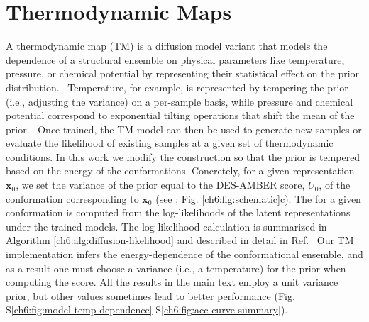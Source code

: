 
\section{Thermodynamic Maps}
{}
\label{ch6:methods:thermodynamic-map}

A thermodynamic map (TM) is a diffusion model variant that models the dependence of a structural ensemble on physical parameters like temperature, pressure, or chemical potential by representing their statistical effect on the prior distribution.~\cite{herron2024inferring,exptm,beyerle2025inferring} Temperature, for example, is represented by tempering the prior (i.e., adjusting the variance) on a per-sample basis, while pressure and chemical potential correspond to exponential tilting operations that shift the mean of the prior.~\cite{herron2024inferring,exptm} Once trained, the TM model can then be used to generate new samples or evaluate the likelihood of existing samples at a given set of thermodynamic conditions. In this work we modify the construction so that the prior is tempered based on the energy of the conformations. Concretely, for a given representation $\mathbf{x}_0$, we set the variance of the prior equal to the DES-AMBER score, $U_0$, of the conformation corresponding to $\mathbf{x}_0$ (see ; Fig. \ref{ch6:fig:schematic}c). The  for a given conformation is computed from the log-likelihoods of the latent representations under the trained models. The log-likelihood calculation is summarized in Algorithm \ref{ch6:alg:diffusion-likelihood} and described in detail in Ref.~\cite{john2025comparison} Our TM implementation infers the energy-dependence of the conformational ensemble, and as a result one must choose a variance (i.e., a temperature) for the prior when computing the score. All the results in the main text employ a unit variance prior, but other values sometimes lead to better performance (Fig. S\ref{ch6:fig:model-temp-dependence}-S\ref{ch6:fig:acc-curve-summary}).

